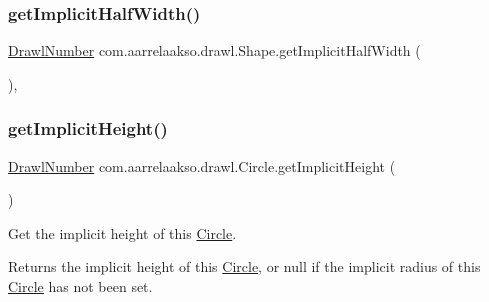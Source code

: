 \subsubsection{\texorpdfstring{get\+Implicit\+Half\+Width()}{getImplicitHalfWidth()}}
{\footnotesize\ttfamily \hyperlink{classcom_1_1aarrelaakso_1_1drawl_1_1_drawl_number}{Drawl\+Number} com.\+aarrelaakso.\+drawl.\+Shape.\+get\+Implicit\+Half\+Width (\begin{DoxyParamCaption}{ }\end{DoxyParamCaption})\hspace{0.3cm}{\ttfamily [protected]}, {\ttfamily [inherited]}}

\mbox{\label{classcom_1_1aarrelaakso_1_1drawl_1_1_circle_a866cede87fd3253b3e4f93d9970717c3}} 
\subsubsection{\texorpdfstring{get\+Implicit\+Height()}{getImplicitHeight()}}
{\footnotesize\ttfamily \hyperlink{classcom_1_1aarrelaakso_1_1drawl_1_1_drawl_number}{Drawl\+Number} com.\+aarrelaakso.\+drawl.\+Circle.\+get\+Implicit\+Height (\begin{DoxyParamCaption}{ }\end{DoxyParamCaption})\hspace{0.3cm}{\ttfamily [protected]}}



Get the implicit height of this \hyperlink{classcom_1_1aarrelaakso_1_1drawl_1_1_circle}{Circle}. 

\begin{DoxyReturn}{Returns}
the implicit height of this \hyperlink{classcom_1_1aarrelaakso_1_1drawl_1_1_circle}{Circle}, or {\ttfamily null} if the implicit radius of this \hyperlink{classcom_1_1aarrelaakso_1_1drawl_1_1_circle}{Circle} has not been set. 
\end{DoxyReturn}
\mbox{\label{classcom_1_1aarrelaakso_1_1drawl_1_1_circle_a8538bba4325dbf2c95ab3a597bcb70c6}} 
